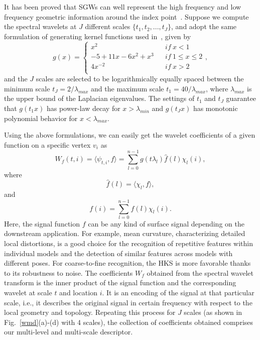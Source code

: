 It has been proved that SGWs can well represent the high frequency
and low frequency geometric information around the index
point~\cite{Hammond2011}.  Suppose we compute the spectral wavelets
at $J$ different scales $\{t_1,t_2,...,t_J\}$, and adopt the same
formulation of generating kernel functions used
in~\cite{Hammond2011}, given by
\begin{equation}
g(x)=\left\{
\begin{array}{lcl}
x^2                &      & {if\  x<1}\\
-5 +11x-6x^2 +x^3  &      & {if\  1 \leq x \leq 2}\\
4x^{-2}            &      & {if\  x>2}\\
\end{array} \right.,
\end{equation}
and the $J$ scales are selected to be logarithmically equally spaced
between the minimum scale $t_J = 2/\lambda_{max}$ and the maximum
scale $t_1=40/\lambda_{max}$, where $\lambda_{max}$ is the upper bound
of the Laplacian eigenvalues. The settings of $t_1$ and $t_J$
guarantee that $g(t_1 x)$ has power-law decay for $x>\lambda_{min}$
and $g(t_J x)$ has monotonic polynomial behavior for $x<\lambda_{max}$.

Using the above formulations, we can easily get the wavelet
coefficients of a given function on a specific vertex $v_i$ as
\begin{equation}
\label{eq:WMD}
W_f(t,i) = \langle \psi_{t,i},f \rangle = \sum_{l=0}^{n-1}g(t\lambda_l)\hat{f}(l)\chi_l(i),
\end{equation}
where
\begin{equation}
  \hat{f}(l) = \langle \chi_l,f \rangle,
\end{equation}
and
\begin{equation}
  f(i) = \sum_{l=0}^{n-1} \hat{f}(l) \chi_l(i).
\end{equation}
Here, the signal function $f$ can be any kind of surface signal
depending on the downstream application. For example, mean curvature,
characterizing detailed local distortions, is a good choice for the
recognition of repetitive features within individual models and the
detection of similar features across models with different poses.
For coarse-to-fine recognition, the HKS is more favorable thanks to
its robustness to noise. The coefficients $W_f$
obtained from the spectral wavelet transform is the inner product of the signal
function and the corresponding wavelet at scale $t$ and location $i$.
It is an encoding of the signal at that particular scale, i.e.,
it describes the original signal in certain frequency with respect to
the local geometry and topology. Repeating this process for $J$
scales (as shown in Fig.~\ref{wmd}(a)-(d) with 4 scales), the collection of
coefficients obtained comprises our multi-level and multi-scale descriptor.

